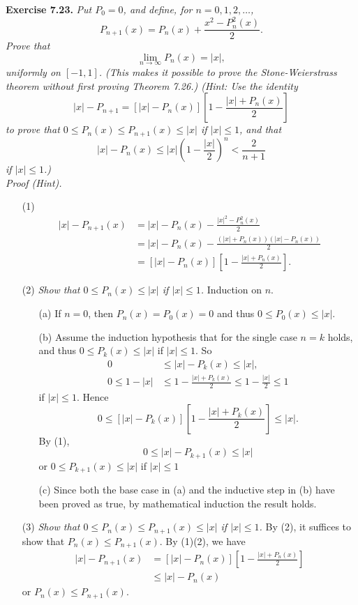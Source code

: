\documentclass{article}
\begin{document}
\textbf{Exercise 7.23.}
\emph{Put $P_0 = 0$, and define, for $n = 0,1,2,\ldots$,
\[
  P_{n+1}(x) = P_n(x) + \frac{x^2-P_n^2(x)}{2}.
\]
Prove that
\[
  \lim_{n \to \infty} P_n(x) = |x|,
\]
uniformly on $[-1,1]$.
(This makes it possible to prove the Stone-Weierstrass theorem without
first proving Theorem 7.26.)
(Hint: Use the identity
\[
  |x| - P_{n+1} = [|x| - P_n(x)]\left[1-\frac{|x|+P_n(x)}{2}\right]
\]
to prove that $0 \leq P_n(x) \leq P_{n+1}(x) \leq |x|$ if $|x| \leq 1$, and that
\[
  |x| - P_n(x) \leq |x| \left(1-\frac{|x|}{2}\right)^n < \frac{2}{n+1}
\]
if $|x| \leq 1$.)} \\

\emph{Proof (Hint).}
\begin{enumerate}
\item[(1)]
\begin{align*}
  |x| - P_{n+1}(x)
  &= |x| - P_n(x) - \frac{|x|^2 - P_n^2(x)}{2} \\
  &= |x| - P_n(x) - \frac{(|x| + P_n(x))(|x| - P_n(x))}{2} \\
  &= [|x| - P_n(x)]\left[1-\frac{|x|+P_n(x)}{2}\right].
\end{align*}

\item[(2)]
\emph{Show that $0 \leq P_n(x) \leq |x|$ if $|x| \leq 1$.}
Induction on $n$.
  \begin{enumerate}
  \item[(a)]
  If $n = 0$, then $P_n(x) = P_0(x) = 0$ and thus $0 \leq P_0(x) \leq |x|$.

  \item[(b)]
  Assume the induction hypothesis that for the single case $n = k$ holds,
  and thus $0 \leq P_k(x) \leq |x|$ if $|x| \leq 1$.
  So
  \begin{align*}
    0 &\leq |x|-P_k(x) \leq |x|, \\
    0 \leq 1-|x| &\leq 1-\frac{|x|+P_k(x)}{2} \leq 1-\frac{|x|}{2} \leq 1
  \end{align*}
  if $|x| \leq 1$.
  Hence
  \[
    0 \leq [|x| - P_k(x)]\left[1-\frac{|x|+P_k(x)}{2}\right] \leq |x|.
  \]
  By (1),
  \[
    0 \leq |x| - P_{k+1}(x) \leq |x|
  \]
  or $0 \leq P_{k+1}(x) \leq |x|$ if $|x| \leq 1$

  \item[(c)]
  Since both the base case in (a) and
  the inductive step in (b) have been proved as true,
  by mathematical induction the result holds.
  \end{enumerate}

\item[(3)]
\emph{Show that $0 \leq P_n(x) \leq P_{n+1}(x) \leq |x|$ if $|x| \leq 1$.}
By (2), it suffices to show that $P_{n}(x) \leq P_{n+1}(x)$.
By (1)(2), we have
\begin{align*}
  |x| - P_{n+1}(x)
  &= [|x| - P_n(x)]\left[1-\frac{|x|+P_n(x)}{2}\right] \\
  &\leq |x| - P_n(x)
\end{align*}
or $P_{n}(x) \leq P_{n+1}(x)$.


\end{enumerate}
\end{document}
